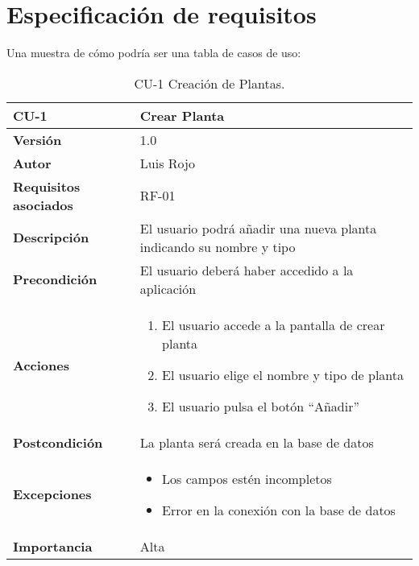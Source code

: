 \section{Especificación de requisitos}


Una muestra de cómo podría ser una tabla de casos de uso:

\begin{table}[p]
	\centering
	\begin{tabularx}{\linewidth}{ p{} p{} }
		\toprule
		\textbf{CU-1}    & \textbf{Crear Planta}\\
		\toprule
		\textbf{Versión}              & 1.0    \\
		\textbf{Autor}                & Luis Rojo \\
		\textbf{Requisitos asociados} & RF-01 \\
		\textbf{Descripción}          & El usuario podrá añadir una nueva planta indicando su nombre y tipo \\
		\textbf{Precondición}         &  El usuario deberá haber accedido a la aplicación \\
		\textbf{Acciones}             &
		\begin{enumerate}
			\def\labelenumi{\arabic{enumi}.}
			\tightlist
			\item El usuario accede a la pantalla de crear planta
			\item El usuario elige el nombre y tipo de planta
                \item El usuario pulsa el botón ``Añadir''
		\end{enumerate}\\
		\textbf{Postcondición}        & La planta será creada en la base de datos \\
		\textbf{Excepciones}          & 
            \begin{itemize}
                \item Los campos estén incompletos
                \item Error en la conexión con la base de datos
            \end{itemize}\\
		\textbf{Importancia}          & Alta  \\
		\bottomrule
	\end{tabularx}
	\caption{CU-1 Creación de Plantas.}
\end{table}


